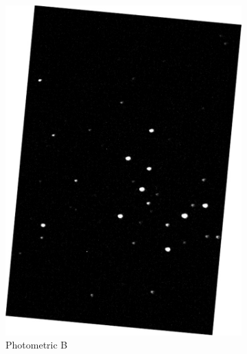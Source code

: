 \documentclass[%
aip,
jmp,
reprint,
floatfix,
nofootinbib
]{revtex4-1}
\begin{document}
	
	\begin{figure}[H]
		\centering
		\begin{subfigure}[]{0.3\textwidth}
			\centering
			\includegraphics[width=\linewidth]{figs/b.pdf}
			\caption{Photometric B}
			\label{fig:b}
		\end{subfigure}
		\begin{subfigure}[]{0.3\textwidth}
			\centering

\end{subfigure}
\end{figure}
\end{document}
